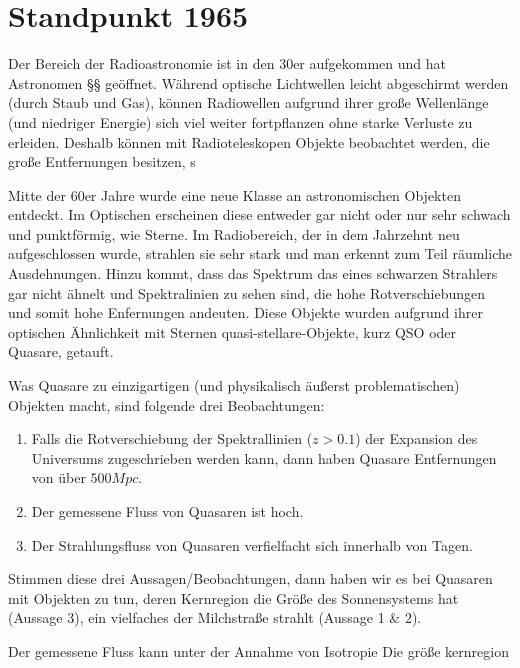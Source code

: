 
\section{Standpunkt 1965}
Der Bereich der Radioastronomie ist in den 30er aufgekommen und hat Astronomen §§ geöffnet. Während optische Lichtwellen leicht abgeschirmt werden (durch Staub und Gas), können Radiowellen aufgrund ihrer große Wellenlänge (und niedriger Energie) sich viel weiter fortpflanzen ohne starke Verluste zu erleiden. Deshalb können mit Radioteleskopen Objekte beobachtet werden, die große Entfernungen besitzen, s

Mitte der 60er Jahre wurde eine neue Klasse an astronomischen Objekten entdeckt. Im Optischen erscheinen diese entweder gar nicht oder nur sehr schwach und punktförmig, wie Sterne. Im Radiobereich, der in dem Jahrzehnt neu aufgeschlossen wurde, strahlen sie sehr stark und man erkennt zum Teil räumliche Ausdehnungen. Hinzu  kommt, dass das Spektrum das eines schwarzen Strahlers gar nicht ähnelt und Spektralinien zu sehen sind, die hohe Rotverschiebungen und somit hohe Enfernungen andeuten. Diese Objekte wurden aufgrund ihrer optischen Ähnlichkeit mit Sternen quasi-stellare-Objekte, kurz QSO oder Quasare, getauft. 

Was Quasare zu einzigartigen (und physikalisch äußerst problematischen) Objekten macht, sind folgende drei Beobachtungen:
\begin{enumerate}
	\renewcommand{\labelenumi}{\arabic{enumi})}
	\item Falls die Rotverschiebung der Spektrallinien (\( z > 0.1\)) der Expansion des Universums zugeschrieben werden kann, dann haben Quasare Entfernungen von über \( 500 \unit{Mpc} \).
	\item Der gemessene Fluss von Quasaren ist hoch.
	\item Der Strahlungsfluss von Quasaren verfielfacht sich innerhalb von Tagen.
\end{enumerate}

Stimmen diese drei Aussagen/Beobachtungen, dann haben wir es bei Quasaren mit Objekten zu tun, deren Kernregion die Größe des Sonnensystems hat (Aussage 3), ein vielfaches der Milchstraße strahlt (Aussage 1 \& 2). 

Der gemessene Fluss kann unter der Annahme von Isotropie 
Die größe kernregion

 


